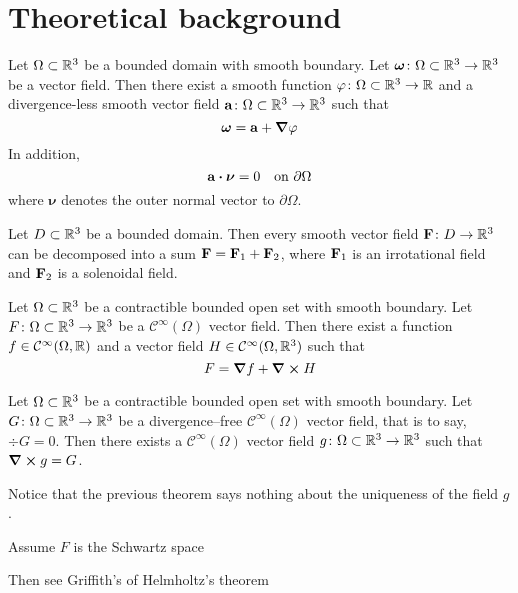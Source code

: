 
\chapter{Theoretical background}

\begin{theorem}
    Let $\Omega \subset \mathbb{R}^3$ be a bounded domain with smooth boundary. Let $\boldsymbol{\omega} \colon \Omega \subset \mathbb{R}^3 \to \mathbb{R}^3$ be a vector field. Then there exist a smooth function $\varphi \colon \Omega \subset \mathbb{R}^3 \to \mathbb{R}$ and a divergence-less smooth vector field $\vb{a} \colon \Omega \subset \mathbb{R}^3 \to \mathbb{R}^3$ such that
    \[
        \boldsymbol{\omega} = \vb{a} + \grad{\varphi}
    \]
    In addition,
    \[
        \vb{a} \vdot \boldsymbol{\nu} = 0 \quad \text{on } \partial \Omega
    \]
    where $\boldsymbol{\nu}$ denotes the outer normal vector to $\partial \Omega$.
\end{theorem}

\begin{theorem}
    Let $D \subset \mathbb{R}^3$ be a bounded domain. Then every smooth vector field
    $\vb{F} \colon D \to \mathbb{R}^3$ can be decomposed into a sum $\vb{F} =
    \vb{F}_1 + \vb{F}_2$, where $\vb{F}_1$ is an irrotational field and
    $\vb{F}_2$ is a solenoidal field.
\end{theorem}

\begin{theorem}
    Let $\Omega \subset \mathbb{R}^3$ be a contractible bounded open set with smooth boundary. Let $F \colon \Omega \subset \mathbb{R}^3 \to \mathbb{R}^3$ be a $\mathcal{C}^\infty(\Omega)$ vector field. Then there exist a function $f \in \mathcal{C}^\infty(\Omega, \mathbb{R})$ and a vector field $H \in \mathcal{C}^\infty(\Omega, \mathbb{R}^3)$ such that
    \[
        F = \grad{f} + \curl{H}
    \]

\end{theorem}

\begin{theorem}
    Let $\Omega \subset \mathbb{R}^3$ be a contractible bounded open set with smooth boundary. Let $G \colon \Omega \subset \mathbb{R}^3 \to \mathbb{R}^3$ be a divergence--free $\mathcal{C}^\infty(\Omega)$ vector field, that is to say, $\div{G} = 0$. Then there exists a $\mathcal{C}^\infty(\Omega)$ vector field $g \colon \Omega \subset \mathbb{R}^3 \to \mathbb{R}^3$ such that $\curl{g} = G$.
\end{theorem}

Notice that the previous theorem says nothing about the uniqueness of the field $g$.

Assume $F$ is the Schwartz space

Then see Griffith's of Helmholtz's theorem
